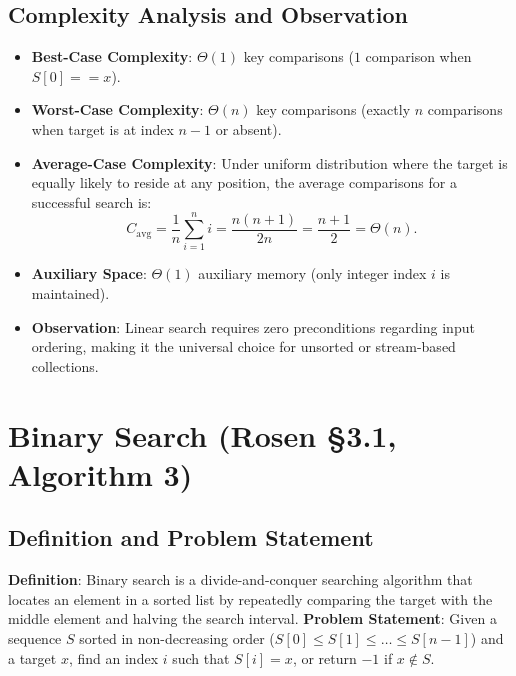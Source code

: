 \documentclass[11pt,a4paper,oneside]{report}
\theoremstyle{definition}
\begin{document}
\subsection{Complexity Analysis and Observation}
\begin{itemize}
    \item \textbf{Best-Case Complexity}: $\Theta(1)$ key comparisons ($1$ comparison when $S[0] == x$).
    \item \textbf{Worst-Case Complexity}: $\Theta(n)$ key comparisons (exactly $n$ comparisons when target is at index $n-1$ or absent).
    \item \textbf{Average-Case Complexity}: Under uniform distribution where the target is equally likely to reside at any position, the average comparisons for a successful search is:
    \begin{equation}
        C_{\text{avg}} = \frac{1}{n} \sum_{i=1}^n i = \frac{n(n + 1)}{2n} = \frac{n + 1}{2} = \Theta(n).
    \end{equation}
    \item \textbf{Auxiliary Space}: $\Theta(1)$ auxiliary memory (only integer index $i$ is maintained).
    \item \textbf{Observation}: Linear search requires zero preconditions regarding input ordering, making it the universal choice for unsorted or stream-based collections.
\end{itemize}

\newpage
\section{Binary Search (Rosen \S3.1, Algorithm 3)}

\subsection{Definition and Problem Statement}
\textbf{Definition}: Binary search is a divide-and-conquer searching algorithm that locates an element in a sorted list by repeatedly comparing the target with the middle element and halving the search interval.
\textbf{Problem Statement}: Given a sequence $S$ sorted in non-decreasing order ($S[0] \le S[1] \le \dots \le S[n-1]$) and a target $x$, find an index $i$ such that $S[i] = x$, or return $-1$ if $x \notin S$.
\end{document}
